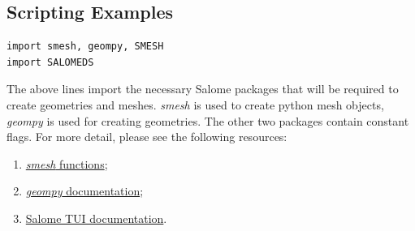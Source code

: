 \subsection{Scripting Examples}




\begin{lstlisting}
import smesh, geompy, SMESH
import SALOMEDS   
\end{lstlisting}


The above lines import the necessary Salome packages that will be required to create geometries and meshes. \textit{smesh} is used to create python mesh objects,
\textit{geompy} is used for creating geometries. The other two packages contain constant flags. For more detail, please see the following resources:

\begin{enumerate}
 \item \href{http://docs.salome-platform.org/salome_6_5_0/gui/SMESH/smeshpy_doc/smesh_8py.html}{\textit{smesh} functions};
 \item \href{http://docs.salome-platform.org/salome_6_5_0/gui/GEOM/tui_basic_geom_objs_page.html}{\textit{geompy} documentation};
 \item \href{http://docs.salome-platform.org/salome_6_5_0/gui/SMESH/smeshpy_interface_page.html}{Salome TUI documentation}.
\end{enumerate}

